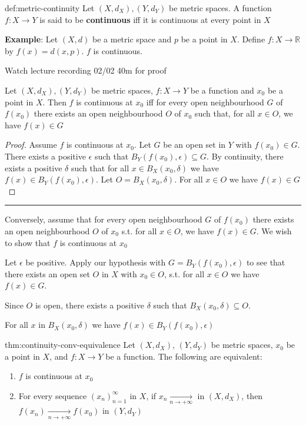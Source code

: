 \documentclass{article}
\begin{document}
\begin{dfn}{def:metric-continuity}{}
    Let $(X, d_{X}), (Y, d_{Y})$ be metric spaces. A function $f: X \to Y $ is said to be \textbf{continuous} iff it is continuous at every point in $X$
\end{dfn}

\textbf{Example}: Let $(X, d)$ be a metric space and $p$ be a point in $X$. Define $f: X \to \mathbb{R} $ by $f(x) = d(x,p)$. $f$ is continuous.

Watch lecture recording 02/02 40m for proof

\begin{thm}[]{}{}
    Let $(X,d_{X}), (Y, d_{Y})$ be metric spaces, $f : X \to Y$ be a function and $x_{0}$ be a point in $X$. Then $f$ is continuous at $x_{0}$ iff for every open neighbourhood $G$ of $f(x_{0})$ there exists an open neighbourhood $O$ of $x_{0}$ such that, for all $x\in O$, we have $f(x) \in G$
\end{thm}

\begin{proof}
    Assume $f$ is continuous at $x_{0}$. Let $G$ be an open set in $Y$ with $f(x_{0})\in G$. There exists a positive $\epsilon$ such that $B_{Y}(f(x_{0}), \epsilon) \subseteq G$. By continuity, there exists a positive $\delta$ such that for all $x\in B_{X}(x_{0}, \delta)$ we have $f(x)\in B_{Y}(f(x_{0}), \epsilon)$. Let $O = B_{X}(x_{0}, \delta)$. For all $x\in O$ we have $f(x)\in G$
\end{proof}

\noindent\rule{\textwidth}{0.2pt}
Conversely, assume that for every open neighbourhood $G$ of $f(x_{0})$ there exists an open neighbourhood $O$ of $x_{0}$ s.t. for all $x\in O$, we have $f(x)\in G$. We wish to show that $f$ is continuous at $x_{0}$

Let $\epsilon$ be positive. Apply our hypothesis with $G = B_{Y}(f(x_{0}), \epsilon)$ to see that there exists an open set $O$ in $X$ with $x_{0}\in O$, s.t. for all $x\in O$ we have $f(x)\in G$.

Since $O$ is open, there exists a positive $\delta$ such that $B_{X}(x_{0}, \delta) \subseteq O$.

For all $x$ in $B_{X}(x_{0}, \delta)$ we have $f(x) \in B_{Y}(f(x_{0}), \epsilon)$

\begin{thm}{thm:continuity-conv-equivalence}{}
    Let $(X, d_{X}),\, (Y, d_{Y})$ be metric spaces, $x_{0}$ be a point in $X$, and $f : X \to Y$ be a function. The following are equivalent:
    \begin{enumerate}
        \item $f$ is continuous at $x_{0}$
        \item For every sequence $(x_{n})^{\infty}_{n = 1}$ in $X$, if $x_{n}\xrightarrow[n\to +\infty]{}$ in $(X, d_{X})$, then $f(x_{n}) \xrightarrow[n\to +\infty]{} f(x_{0})$ in $(Y, d_{Y})$
    \end{enumerate}
\end{thm}
\end{document}
